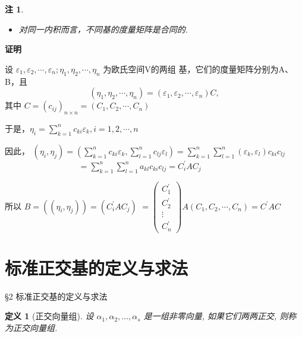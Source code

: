 \documentclass[13pt]{beamer}
\newtheorem*{defi}{定义}
\newtheorem*{rem}{注}
\def\pf{{\bf 证明~~ }}
\begin{document}
\begin{frame}

\begin{rem}
	\begin{itemize}
	\item 对同一内积而言，不同基的度量矩阵是合同的. 
	\end{itemize}
\end{rem}
\pf
\small{ 设 $\varepsilon_{1}, \varepsilon_{2}, \cdots, \varepsilon_{n} ; \eta_{1}, \eta_{2}, \cdots, \eta_{n}$ 为欧氏空间V的两组
基，它们的度量矩阵分别为A、B，且
$$\left(\eta_{1}, \eta_{2}, \cdots, \eta_{n}\right)=\left(\varepsilon_{1}, \varepsilon_{2}, \cdots, \varepsilon_{n}\right) C,$$
其中 $C=\left(c_{i j}\right)_{n \times n}=\left(C_{1}, C_{2}, \cdots, C_{n}\right)$

于是，$\eta_{i}=\sum_{k=1}^{n} c_{k i} \varepsilon_{k}, i=1,2, \cdots, n$

因此， 
$\left(\eta_{i}, \eta_{j}\right) =\left(\sum_{k=1}^{n} c_{k i} \varepsilon_{k}, \sum_{l=1}^{n} c_{l j} \varepsilon_{l}\right)=\sum_{k=1}^{n} \sum_{l=1}^{n}\left(\varepsilon_{k}, \varepsilon_{l}\right) c_{k i} c_{l j}$\\
	~~~~~~~~~~~~~~~~~
	$ =\sum_{k=1}^{n} \sum_{l=1}^{n} a_{k l} c_{k i} c_{l j}=C_{i}^{\prime} A C_{j}$

所以 $B=\left(\left(\eta_{i}, \eta_{j}\right)\right)=\left(C_{i}^{\prime} A C_{j}\right)$
$=\left(\begin{array}{c}C_{1}^{\prime} \\ C_{2}^{\prime} \\ \vdots \\ C_{n}^{\prime}\end{array}\right) A\left(C_{1}, C_{2}, \cdots, C_{n}\right)=C^{\prime} A C$
}
\end{frame}

\section{标准正交基的定义与求法}
\begin{frame}{\S 2 标准正交基的定义与求法}

\begin{defi}[正交向量组]
设 $\alpha_{1}, \alpha_{2}, \ldots, \alpha_{s}$ 是一组非零向量, 如果它们两两正交, 则称为\alert{正交向量组}.
\end{defi}
\end{frame}
\end{document}

